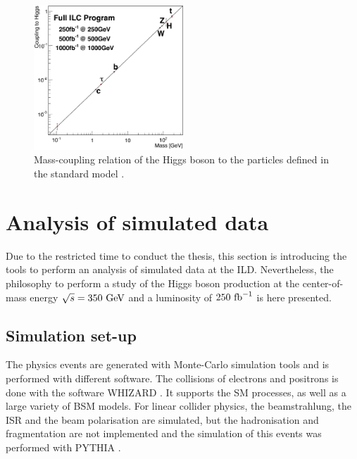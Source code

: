    \begin{figure}[!h]
      \centering
      \includegraphics[width = 0.5\textwidth]{Pictures/Higgs/Chapter_Theory_figs_mass-coupling1TeV.png}
      \caption{Mass-coupling relation of the Higgs boson to the particles defined in the standard model \cite{tian}.}
      \label{fig:coupling}
    \end{figure}


  \section{Analysis of simulated data}
  
    Due to the restricted time to conduct the thesis, this section is introducing the tools to perform an analysis of simulated data at the ILD. 
    Nevertheless, the philosophy to perform a study of the Higgs boson production at the center-of-mass energy $\sqrt{s} = 350~\rm{GeV}$ and a luminosity of $250~\rm{fb}^{-1}$ is here presented.
  
  \subsection{Simulation set-up}  
  \label{subsec:ILCSOFT}

    The physics events are generated with Monte-Carlo simulation tools and is performed with different software.
    The collisions of electrons and positrons is done with the software WHIZARD \cite{WHIZARD}.
    It supports the \gls{SM} processes, as well as a large variety of BSM models.
    For linear collider physics, the beamstrahlung, the \gls{ISR} and the beam polarisation are simulated, but the hadronisation and fragmentation are not implemented and the simulation of this events was performed with PYTHIA \cite{PYTHIA}.
  
